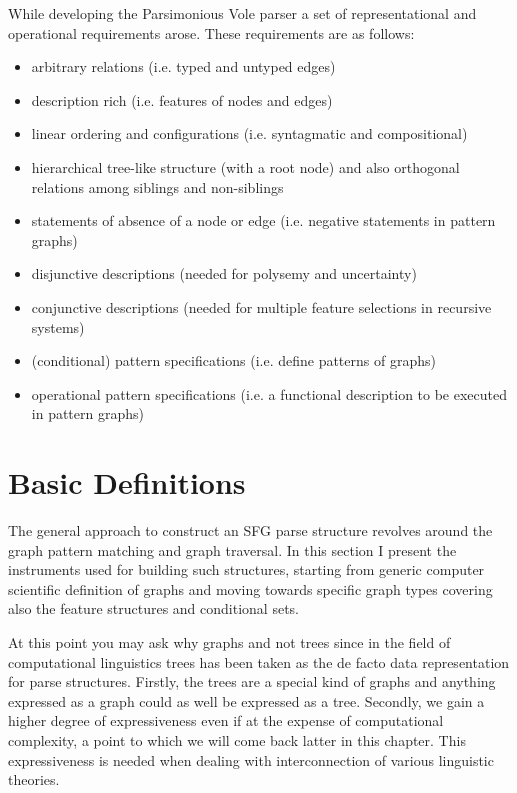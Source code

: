 While developing the Parsimonious Vole parser a set of representational and operational requirements arose. These requirements are as follows:
\begin{itemize}
	\item arbitrary relations (i.e. typed and untyped edges)
	\item description rich (i.e. features of nodes and edges)
	\item linear ordering and configurations (i.e. syntagmatic and compositional)
	\item hierarchical tree-like structure (with a root node) and also orthogonal relations among siblings and non-siblings
	\item statements of absence of a node or edge (i.e. negative statements in pattern graphs)
	\item disjunctive descriptions (needed for polysemy and uncertainty)
	\item conjunctive descriptions (needed for multiple feature selections in recursive systems)
	\item (conditional) pattern specifications (i.e. define patterns of graphs)
	\item operational pattern specifications (i.e. a functional description to be executed in pattern graphs)
\end{itemize}

\section{Basic Definitions}
The general approach to construct an SFG parse structure revolves around the graph pattern matching and graph traversal. In this section I present the instruments used for building such structures, starting from generic computer scientific definition of graphs and moving towards specific graph types covering also the feature structures and conditional sets. 

At this point you may ask why graphs and not trees since in the field of computational linguistics trees has been taken as the de facto data representation for parse structures. Firstly, the trees are a special kind of graphs and anything expressed as a graph could as well be expressed as a tree. Secondly, we gain a higher degree of expressiveness even if at the expense of computational complexity, a point to which we will come back latter in this chapter.  This expressiveness is needed when dealing with interconnection of various linguistic theories. 

